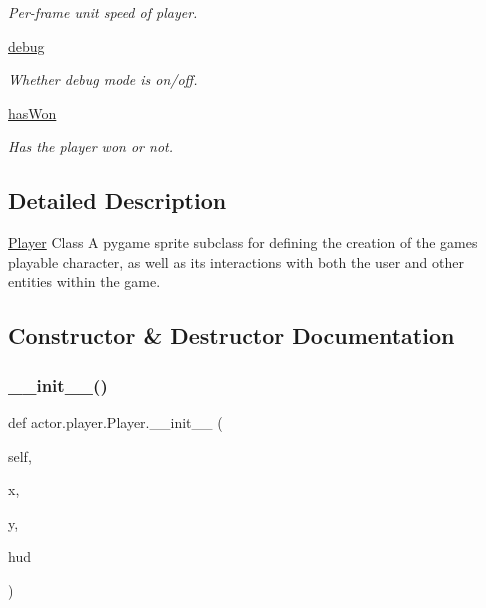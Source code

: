 \begin{DoxyCompactItemize}
\begin{DoxyCompactList}\small\item\em Per-\/frame unit speed of player. \end{DoxyCompactList}\item 
\mbox{\label{classactor_1_1player_1_1_player_a5cf8c2343817f5fdf357579fc078b677}} 
\hyperlink{classactor_1_1player_1_1_player_a5cf8c2343817f5fdf357579fc078b677}{debug}
\begin{DoxyCompactList}\small\item\em Whether debug mode is on/off. \end{DoxyCompactList}\item 
\mbox{\label{classactor_1_1player_1_1_player_aa3b90c5623839511cd22f4e0ee1745ea}} 
\hyperlink{classactor_1_1player_1_1_player_aa3b90c5623839511cd22f4e0ee1745ea}{has\+Won}
\begin{DoxyCompactList}\small\item\em Has the player won or not. \end{DoxyCompactList}\end{DoxyCompactItemize}


\subsection{Detailed Description}
\hyperlink{classactor_1_1player_1_1_player}{Player} Class  A pygame sprite subclass for defining the creation of the game\textquotesingle{}s playable character, as well as its interactions with both the user and other entities within the game. 

\subsection{Constructor \& Destructor Documentation}
\mbox{\label{classactor_1_1player_1_1_player_ab706da8ac6c2ddecb694069c9c55485b}} 
\subsubsection{\texorpdfstring{\+\_\+\+\_\+init\+\_\+\+\_\+()}{\_\_init\_\_()}}
{\footnotesize\ttfamily def actor.\+player.\+Player.\+\_\+\+\_\+init\+\_\+\+\_\+ (\begin{DoxyParamCaption}\item[{}]{self,  }\item[{}]{x,  }\item[{}]{y,  }\item[{}]{hud }\end{DoxyParamCaption})}



